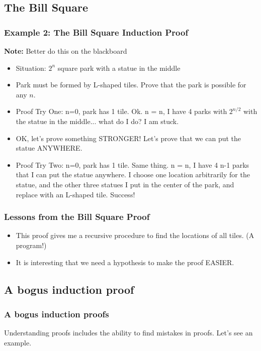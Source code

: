 \documentclass{beamer}
\begin{document}
\subsection{The Bill Square}
\begin{frame}
  \frametitle{Example 2: The Bill Square Induction Proof}

  {\bf Note:} Better do this on the blackboard

  \begin{itemize}
  \item Situation: $2^n$ square park with a statue in the middle
  \item Park must be formed by L-shaped tiles. Prove that the park is possible for any $n$.
  \item Proof Try One: n=0, park has 1 tile. Ok. n = n, I have 4 parks with $2^{n/2}$ with the statue in the middle... what do I do? I am stuck.
  \item OK, let's prove something STRONGER! Let's prove that we can
    put the statue ANYWHERE.
  \item Proof Try Two: n=0, park has 1 tile. Same thing. n = n, I have
    4 n-1 parks that I can put the statue anywhere. I choose one
    location arbitrarily for the statue, and the other three statues I
    put in the center of the park, and replace with an L-shaped
    tile. Success!    
  \end{itemize}
\end{frame}

\begin{frame}
  \frametitle{Lessons from the Bill Square Proof}

  {\large
    \begin{itemize}
    \item This proof gives me a recursive procedure to find the
      locations of all tiles. (A program!)

      \bigskip
      
    \item It is interesting that we need a 
      hypothesis to make the proof \alert{EASIER}.
    \end{itemize}
  }
\end{frame}

\subsection{A bogus induction proof}
\begin{frame}
  \frametitle{A bogus induction proofs}

  {\huge Understanding proofs includes the ability to find mistakes in
    proofs. Let's see an example.  }
\end{frame}
\end{document}
